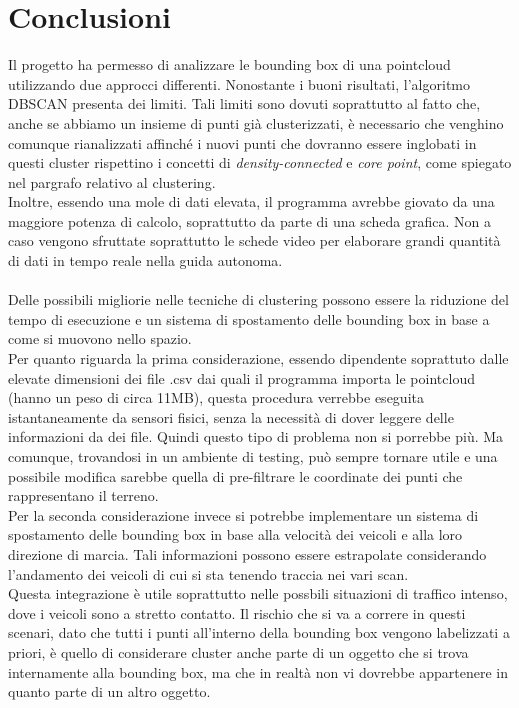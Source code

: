 \documentclass[italian]{report}
\begin{document}
\chapter{Conclusioni}
Il progetto ha permesso di analizzare le bounding box di una pointcloud utilizzando due approcci differenti. Nonostante i buoni risultati, l'algoritmo DBSCAN presenta dei limiti. Tali limiti sono dovuti soprattutto al fatto che, anche se abbiamo un insieme di punti già clusterizzati, è necessario che venghino comunque rianalizzati affinché i nuovi punti che dovranno essere inglobati in questi cluster rispettino i concetti di \textit{density-connected} e \textit{core point}, come spiegato nel pargrafo relativo al clustering.\\
Inoltre, essendo una mole di dati elevata, il programma avrebbe giovato da una maggiore potenza di calcolo, soprattutto da parte di una scheda grafica. Non a caso vengono sfruttate soprattutto le schede video per elaborare grandi quantità di dati in tempo reale nella guida autonoma.\\
\\
Delle possibili migliorie nelle tecniche di clustering possono essere la riduzione del tempo di esecuzione e un sistema di spostamento delle bounding box in base a come si muovono nello spazio.\\
Per quanto riguarda la prima considerazione, essendo dipendente soprattuto dalle elevate dimensioni dei file .csv dai quali il programma importa le pointcloud (hanno un peso di circa 11MB), questa procedura verrebbe eseguita istantaneamente da sensori fisici, senza la necessità di dover leggere delle informazioni da dei file. Quindi questo tipo di problema non si porrebbe più. Ma comunque, trovandosi in un ambiente di testing, può sempre tornare utile e una possibile modifica sarebbe quella di pre-filtrare le coordinate dei punti che rappresentano il terreno.\\
Per la seconda considerazione invece si potrebbe implementare un sistema di spostamento delle bounding box in base alla velocità dei veicoli e alla loro direzione di marcia. Tali informazioni possono essere estrapolate considerando l'andamento dei veicoli di cui si sta tenendo traccia nei vari scan.\\
Questa integrazione è utile soprattutto nelle possbili situazioni di traffico intenso, dove i veicoli sono a stretto contatto. Il rischio che si va a correre in questi scenari, dato che tutti i punti all'interno della bounding box vengono labelizzati a priori, è quello di considerare cluster anche parte di un oggetto che si trova internamente alla bounding box, ma che in realtà non vi dovrebbe appartenere in quanto parte di un altro oggetto.\\
\end{document}
